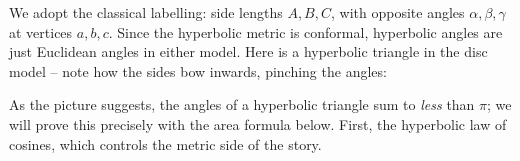 We adopt the classical labelling: side lengths $A, B, C$, with opposite angles $\alpha, \beta, \gamma$ at vertices $a, b, c$. Since the hyperbolic metric is conformal, hyperbolic angles are just Euclidean angles in either model. Here is a hyperbolic triangle in the disc model -- note how the sides bow inwards, pinching the angles:
\begin{center}
\end{center}
As the picture suggests, the angles of a hyperbolic triangle sum to \emph{less} than $\pi$; we will prove this precisely with the area formula below. First, the hyperbolic law of cosines, which controls the metric side of the story.


